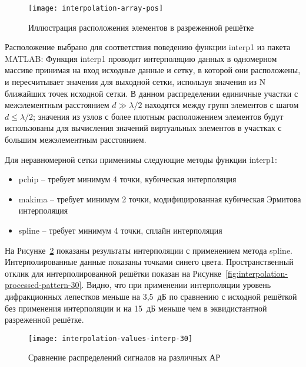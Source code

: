 \begin{figure}[H]
    \centering
    \texttt{[image: interpolation-array-pos]}
    \caption{Иллюстрация расположения элементов в разреженной решётке}
    \label{fig:interpolation-array-pos}
\end{figure}
    

Расположение выбрано для соответствия поведению функции interp1 из пакета MATLAB: 
Функция interp1 проводит интерполяцию данных в одномерном массиве принимая на вход исходные данные и сетку, 
в которой они расположены, и пересчитывает значения для выходной сетки, используя значения из N ближайших точек 
исходной сетки. 
В данном распределении единичные участки с межэлементным расстоянием $d\gg\lambda/2$ находятся между 
групп элементов с шагом $d\leq \lambda/2$;
значения из узлов с более плотным расположением элементов будут использованы для вычисления значений виртуальных 
элементов в участках с большим межэлементным расстоянием. 

Для неравномерной сетки применимы следующие методы функции interp1:

\begin{itemize}
    \item pchip -- требует минимум 4 точки, кубическая интерполяция
    \item makima -- требует минимум 2 точки, модифицированная кубическая Эрмитова интерполяция
    \item spline -- требует минимум 4 точки, сплайн интерполяция
\end{itemize}

На Рисунке~\ref{fig:interpolation-values-interp-30} показаны результаты интерполяции с применением метода spline. 
Интерполированные данные показаны 
точками синего цвета. Пространственный отклик для интерполированной решётки показан на 
Рисунке~\ref{fig:interpolation-processed-pattern-30}. 
Видно, что при применении интерполяции уровень дифракционных лепестков меньше на {3,5}~дБ по сравнению 
с исходной решёткой без применения интерполяции и на 15~дБ меньше чем в 
эквидистантной разреженной решётке.

\begin{figure}[H]
    \centering
    \texttt{[image: interpolation-values-interp-30]}
    \caption{Сравнение распределений сигналов на различных АР}
    \label{fig:interpolation-values-interp-30}
\end{figure}

